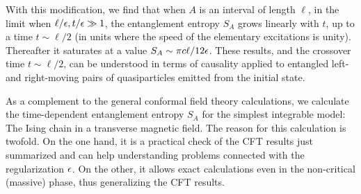 With this modification, we find that when $A$ is an interval of length
$\ell$, in the limit when $\ell/\epsilon,t/\epsilon\gg1$, the
entanglement entropy $S_A$ grows linearly with $t$, up to a time 
$t\sim\ell/2$ (in units where the speed of the
elementary excitations is unity). Thereafter 
it saturates at a value
$S_A\sim \pi c\ell/12\epsilon$. These results, and the crossover time 
$t\sim\ell/2$, can be understood in terms of causality applied to
entangled left- and right-moving pairs of quasiparticles emitted
from the initial state. 



As a complement to the general conformal field theory calculations, we 
calculate the time-dependent entanglement entropy $S_A$ 
for the simplest integrable model: The Ising chain in a transverse magnetic 
field. The reason for this calculation is twofold. 
On the one hand, it is a practical check of the CFT results just summarized 
and can help understanding problems connected with the 
regularization $\epsilon$. %
On the other, it allows exact calculations even in the non-critical 
(massive) phase, thus generalizing the CFT results.

